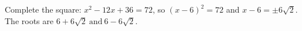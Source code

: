Complete the square: $x^2-12x+36=72$, so $(x-6)^2=72$ and $x-6=\pm6\sqrt2$. The roots are $\boxed{6+6\sqrt2\ \text{and}\ 6-6\sqrt2}$.
